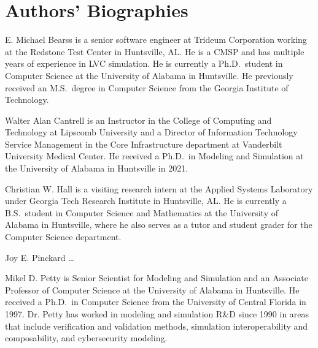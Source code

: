 \section{Authors' Biographies}\label{sec:Biographies}
    E. Michael Bearss is a senior software engineer at Trideum Corporation working
    at the Redstone Test Center in Huntsville, AL\@.
    He is a CMSP and has multiple years of experience in LVC simulation.
    He is currently a Ph.D.\ student in Computer Science at the
    University of Alabama in Huntsville.
    He previously received an M.S.\ degree in Computer Science from the
    Georgia Institute of Technology.

    Walter Alan Cantrell is an Instructor in the College of Computing and Technology
    at Lipscomb University and a Director of Information Technology Service Management
    in the Core Infrastructure department at Vanderbilt University Medical Center.
    He received a Ph.D.\ in Modeling and Simulation at the University of Alabama
    in Huntsville in 2021.

    Christian W. Hall is a visiting research intern at the Applied Systems Laboratory
    under Georgia Tech Research Institute in Huntsville, AL\@.
    He is currently a B.S.\ student in Computer Science and Mathematics at the University
    of Alabama in Huntsville, where he also serves as a tutor and student grader for the
    Computer Science department.

    Joy E. Pinckard \ldots

    Mikel D. Petty is Senior Scientist for Modeling and Simulation and an
    Associate Professor of Computer Science at the University of Alabama in Huntsville.
    He received a Ph.D.\ in Computer Science from the University of Central Florida in 1997.
    Dr. Petty has worked in modeling and simulation R\&D since 1990 in areas that include
    verification and validation methods, simulation interoperability and composability,
    and cybersecurity modeling.
